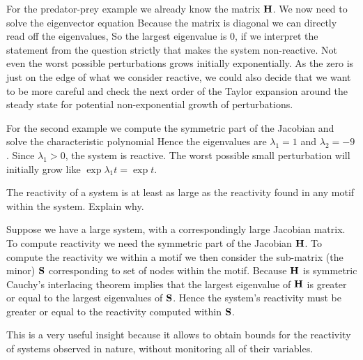 \solution
For the predator-prey example we already know the matrix $\bf H$. We now need to solve the eigenvector equation 
Because the matrix is diagonal we can directly read off the eigenvalues,
So the largest eigenvalue is 0, if we interpret the statement from the question strictly that makes the system non-reactive. Not even the worst possible perturbations grows initially exponentially. As the zero is just on the edge of what we consider reactive, we could also decide that we want to be more careful and check the next order of the Taylor expansion around the steady state for potential non-exponential growth of perturbations. 

For the second example we compute the symmetric part of the Jacobian
and solve the characteristic polynomial
Hence the eigenvalues are $\lambda_1=1$ and $\lambda_2=-9$. Since $\lambda_1>0$, the system is reactive. The worst possible small perturbation will initially grow like $\exp{\lambda_1 t}=\exp{t}$. 

\subquestion
The reactivity of a system is at least as large as the reactivity found in any motif within the system. Explain why. 

\solution
Suppose we have a large system, with a correspondingly large Jacobian matrix. To compute reactivity we need the symmetric part of the Jacobian $\bf H$. To compute the reactivity we within a motif we then consider the sub-matrix (the minor) $\bf S$ corresponding to set of nodes within the motif. Because $\bf H$ is symmetric Cauchy's interlacing theorem implies that the largest eigenvalue of $\bf H$ is greater or equal to the largest eigenvalues of $\bf S$. Hence the system's reactivity must be greater or equal to the reactivity computed within $\bf S$. 

This is a very useful insight because it allows to obtain bounds for the reactivity of systems observed in nature, without monitoring all of their variables.  


